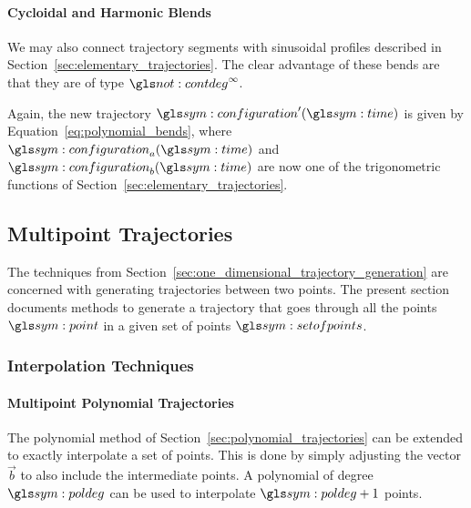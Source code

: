 
			\paragraph{Cycloidal and Harmonic Blends}%
			\label{cycloidal_and_harmonic_blends}

				We may also connect trajectory segments with sinusoidal
				profiles described in Section~\ref{sec:elementary_trajectories}.
				The clear advantage of these bends are that they are of type
				$\contdeg{\infty}$.

				Again, the new trajectory $\configuration'(\timesym)$ is given
				by Equation~\ref{eq:polynomial_bends}, where
				$\configuration_a(\timesym)$ and $\configuration_b(\timesym)$
				are now one of the trigonometric functions of
				Section~\ref{sec:elementary_trajectories}.

	\subsection{Multipoint Trajectories}%
	\label{sec:multipoint_trajectories}

		The techniques from
		Section~\ref{sec:one_dimensional_trajectory_generation} are concerned
		with generating trajectories between two points. The present section
		documents methods to generate a trajectory that goes through all the
		points $\point$ in a given set of points $\setofpoints$.


		\subsubsection{Interpolation Techniques}%
		\label{sec:interpolation_techniques}

			\paragraph{Multipoint Polynomial Trajectories}%
			\label{sec:multipoint_polynomial_trajectories}


				The polynomial method of
				Section~\ref{sec:polynomial_trajectories} can be extended to
				exactly interpolate a set of points. This is done by simply
				adjusting the vector  $\vec{b}$ to also include the
				intermediate points. A polynomial of degree $\poldeg$ can be
				used to interpolate $\poldeg + 1$ points.

